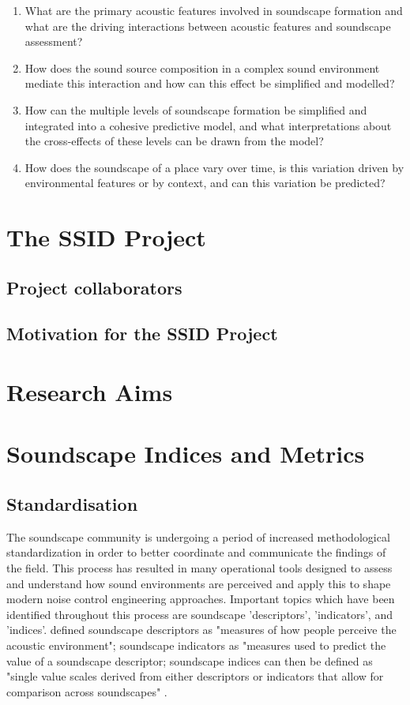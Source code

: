 \begin{enumerate}
  \item What are the primary acoustic features involved in soundscape formation and what are the driving interactions between acoustic features and soundscape assessment?
  \item How does the sound source composition in a complex sound environment mediate this interaction and how can this effect be simplified and modelled?
  \item How can the multiple levels of soundscape formation be simplified and integrated into a cohesive predictive model, and what interpretations about the cross-effects of these levels can be drawn from the model?
  \item How does the soundscape of a place vary over time, is this variation driven by environmental features or by context, and can this variation be predicted?
\end{enumerate}

\section{The SSID Project}

\subsection{Project collaborators}

\subsection{Motivation for the SSID Project}

\section{Research Aims}

\section{Soundscape Indices and Metrics}

\subsection{Standardisation}
The soundscape community is undergoing a period of increased methodological standardization in order to better coordinate and communicate the findings of the field. This process has resulted in many operational tools designed to assess and understand how sound environments are perceived and apply this to shape modern noise control engineering approaches. Important topics which have been identified throughout this process are soundscape 'descriptors', 'indicators', and 'indices'. \citet{Aletta2016Soundscape} defined soundscape descriptors as "measures of how people perceive the acoustic environment"; soundscape indicators as "measures used to predict the value of a soundscape descriptor; soundscape indices can then be defined as "single value scales derived from either descriptors or indicators that allow for comparison across soundscapes" \cite{Kang2019Towards}.

